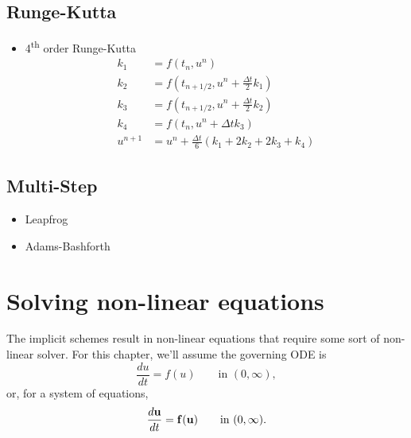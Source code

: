 \documentclass[oneside,a4paper,11pt]{report}
\begin{document}
\section{Runge-Kutta}
\begin{itemize}
\item 4\textsuperscript{th} order Runge-Kutta
\begin{align}
k_1 &= f(t_n, u^n) \nonumber \\
k_2 & = f(t_{n+1/2}, u^n + \frac{\Delta t}{2} k_1) \nonumber \\
k_3 & = f(t_{n+1/2}, u^n + \frac{\Delta t}{2} k_2) \nonumber \\
k_4 & = f(t_n, u^n + \Delta t k_3) \nonumber \\
u^{n+1} &= u^n + \frac{\Delta t}{6} (k_1 + 2k_2 + 2k_3 + k_4)
\end{align}
\end{itemize}

\section{Multi-Step}
\begin{itemize}
\item Leapfrog

\item Adams-Bashforth
\end{itemize}

\chapter{Solving non-linear equations}
The implicit schemes result in non-linear equations that require some sort of non-linear solver. For this chapter, we'll assume the governing ODE is
\begin{equation}
\label{eq:time_stepping_ode}
    \frac{du}{dt} = f(u) \qquad \text{in }(0,\infty),
\end{equation}
or, for a system of equations,
\begin{equation}
\label{eq:time_stepping_ode_system}
    \frac{d\mathbf{u}}{dt} = \mathbf{f}(\mathbf{u}) \qquad \text{in }(0,\infty).
\end{equation}
\end{document}
